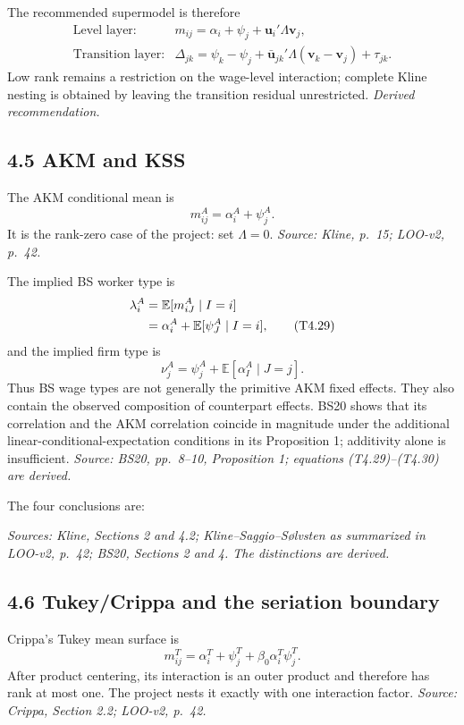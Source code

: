 \documentclass[11pt]{article}
\begin{document}
The recommended supermodel is therefore
\[
\boxed{
\begin{array}{ll}
\text{Level layer:}
&
m_{ij}=\alpha_i+\psi_j+\mathbf u_i'\Lambda\mathbf v_j,\\[0.3em]
\text{Transition layer:}
&
\Delta_{jk}
=
\psi_k-\psi_j
+\bar{\mathbf u}_{jk}'\Lambda(\mathbf v_k-\mathbf v_j)
+\tau_{jk}.
\end{array}}
\tag{T4.27}
\]
Low rank remains a restriction on the wage-level interaction; complete Kline
nesting is obtained by leaving the transition residual unrestricted.
\textit{Derived recommendation.}

\subsection{4.5 AKM and KSS}

The AKM conditional mean is
\[
m^A_{ij}=\alpha_i^A+\psi_j^A.
\tag{T4.28}
\]
It is the rank-zero case of the project: set \(\Lambda=0\).
\textit{Source: Kline, p.\ 15; LOO-v2, p.\ 42.}

The implied BS worker type is
\begin{align}
\lambda_i^A
&=
\mathbb E[m^A_{iJ}\mid I=i] \notag\\
&=
\alpha_i^A+\mathbb E[\psi_J^A\mid I=i],
\tag{T4.29}
\end{align}
and the implied firm type is
\[
\nu_j^A
=
\psi_j^A+\mathbb E[\alpha_I^A\mid J=j].
\tag{T4.30}
\]
Thus BS wage types are not generally the primitive AKM fixed effects.  They
also contain the observed composition of counterpart effects.  BS20 shows
that its correlation and the AKM correlation coincide in magnitude under the
additional linear-conditional-expectation conditions in its Proposition 1;
additivity alone is insufficient.
\textit{Source: BS20, pp.\ 8--10, Proposition 1; equations
(T4.29)--(T4.30) are derived.}

The four conclusions are:

\textit{Sources: Kline, Sections 2 and 4.2; Kline--Saggio--S{\o}lvsten as
summarized in LOO-v2, p.\ 42; BS20, Sections 2 and 4.  The distinctions are
derived.}

\subsection{4.6 Tukey/Crippa and the seriation boundary}

Crippa's Tukey mean surface is
\[
m^T_{ij}
=
\alpha_i^T+\psi_j^T+\beta_0\alpha_i^T\psi_j^T.
\tag{T4.31}
\]
After product centering, its interaction is an outer product and therefore
has rank at most one.  The project nests it exactly with one interaction
factor.
\textit{Source: Crippa, Section 2.2; LOO-v2, p.\ 42.}
\end{document}

